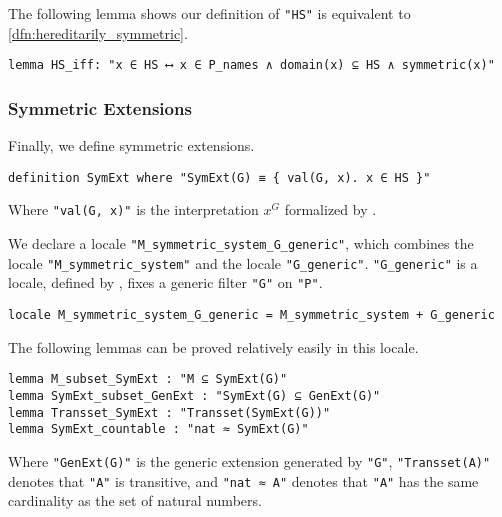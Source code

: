 \documentclass{report}
\newenvironment{isaframe}{\begin{mdframed}[topline=false, rightline=false, bottomline=false]}{\end{mdframed}}
\begin{document}
The following lemma shows our definition of \texttt{"HS"} is equivalent to \cref{dfn:hereditarily_symmetric}.

\begin{isaframe}
\begin{verbatim}
lemma HS_iff: "x ∈ HS ⟷ x ∈ P_names ∧ domain(x) ⊆ HS ∧ symmetric(x)" 
\end{verbatim}
\end{isaframe}


\subsubsection{Symmetric Extensions}
Finally, we define symmetric extensions.

\begin{isaframe}
\begin{verbatim}
definition SymExt where "SymExt(G) ≡ { val(G, x). x ∈ HS }" 
\end{verbatim}
\end{isaframe}

Where \texttt{"val(G, x)"} is the interpretation $x^G$ formalized by \cite{gunther_forcing}.

We declare a locale \texttt{"M\_symmetric\_system\_G\_generic"},
which combines the locale \texttt{"M\_symmetric\_system"} and the locale \texttt{"G\_generic"}.
\texttt{"G\_generic"} is a locale, defined by \cite{gunther_forcing}, fixes a generic filter \texttt{"G"} on \texttt{"P"}.

\begin{isaframe}
\begin{verbatim}
locale M_symmetric_system_G_generic = M_symmetric_system + G_generic
\end{verbatim}
\end{isaframe}

The following lemmas can be proved relatively easily in this locale.

\begin{isaframe}
\begin{verbatim}
lemma M_subset_SymExt : "M ⊆ SymExt(G)" 
lemma SymExt_subset_GenExt : "SymExt(G) ⊆ GenExt(G)" 
lemma Transset_SymExt : "Transset(SymExt(G))" 
lemma SymExt_countable : "nat ≈ SymExt(G)" 
\end{verbatim}
\end{isaframe}

Where \texttt{"GenExt(G)"} is the generic extension generated by \texttt{"G"}, 
\texttt{"Transset(A)"} denotes that \texttt{"A"} is transitive, and
\texttt{"nat ≈ A"} denotes that \texttt{"A"} has the same cardinality as the set of natural numbers.
\end{document}
